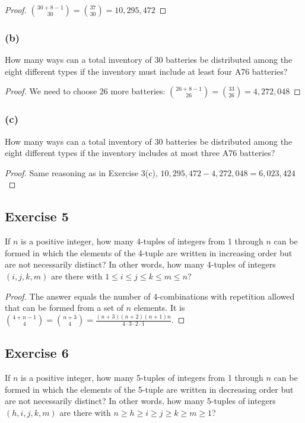 \documentclass[14pt]{extarticle}
\begin{document}
\begin{proof}
\(\binom{30+8-1}{30} = \binom{37}{30} = 10,295,472\)
\end{proof}

\subsubsection{(b)}
How many ways can a total inventory of 30 batteries be distributed among the eight different types if the inventory must include at least four A76 batteries?

\begin{proof}
We need to choose 26 more batteries: \(\binom{26+8-1}{26} = \binom{33}{26} = 4,272,048\)
\end{proof}

\subsubsection{(c)}
How many ways can a total inventory of 30 batteries be distributed among the eight different types if the inventory 
includes at most three A76 batteries?

\begin{proof}
Same reasoning as in Exercise 3(c), \(10,295,472 - 4,272,048 = 6,023,424\)
\end{proof}

\subsection{Exercise 5}
If \(n\) is a positive integer, how many 4-tuples of integers from 1 through \(n\) can be formed in which the elements of 
the 4-tuple are written in increasing order but are not necessarily distinct? In other words, how many 4-tuples of 
integers \((i, j, k, m)\) are there with \(1 \leq i \leq j \leq k \leq m \leq n\)?

\begin{proof}
The answer equals the number of 4-combinations with repetition allowed that can be formed from a set of \(n\) elements. It is
\(\binom{4+n-1}{4} = \binom{n+3}{4} = \frac{(n+3)(n+2)(n+1)n}{4 \cdot 3 \cdot 2 \cdot 1}\).
\end{proof}

\subsection{Exercise 6}
If \(n\) is a positive integer, how many 5-tuples of integers from 1 through \(n\) can be formed in which the elements of 
the 5-tuple are written in decreasing order but are not 
necessarily distinct? In other words, how many 5-tuples of 
integers \((h, i, j, k, m)\) are there with \(n \geq h \geq i 
\geq j \geq k \geq m \geq 1\)?
\end{document}
